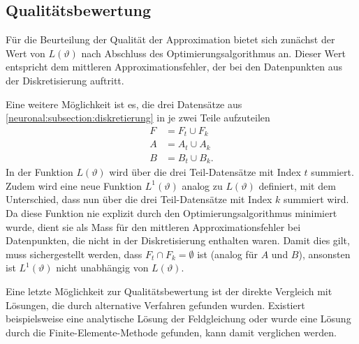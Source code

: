\subsection{Qualitätsbewertung}\label{neuronal:subsection:qualitätsbewertung}
%
Für die Beurteilung der Qualität der Approximation bietet sich zunächst der Wert von \( L(\vartheta) \) nach Abschluss des Optimierungsalgorithmus an.
Dieser Wert entspricht dem mittleren Approximationsfehler, der bei den Datenpunkten aus der Diskretisierung auftritt.

Eine weitere Möglichkeit ist es, die drei Datensätze aus \ref{neuronal:subsection:diskretierung} in je zwei Teile aufzuteilen
\begin{equation*}
    \begin{aligned}
        F &= F_t \cup F_k\\
        A &= A_t \cup A_k\\
        B &= B_t \cup B_k.
    \end{aligned}
\end{equation*}
In der Funktion $L(\vartheta)$ wird über die drei Teil-Datensätze mit Index $t$ summiert.
Zudem wird eine neue Funktion \( L^1(\vartheta) \) analog zu $L(\vartheta)$ definiert, mit dem Unterschied, dass nun über die drei Teil-Datensätze mit Index $k$ summiert wird.
Da diese Funktion nie explizit durch den Optimierungsalgorithmus minimiert wurde, dient sie als Mass für den mittleren Approximationsfehler bei Datenpunkten, die nicht in der Diskretisierung enthalten waren.
Damit dies gilt, muss sichergestellt werden, dass $F_t \cap F_k = \emptyset$ ist (analog für $A$ und $B$), ansonsten ist $L^1(\vartheta)$ nicht unabhängig von $L(\vartheta)$.

Eine letzte Möglichkeit zur Qualitätsbewertung ist der direkte Vergleich mit Lösungen, die durch alternative Verfahren gefunden wurden.
Existiert beispielsweise eine analytische Lösung der Feldgleichung oder wurde eine Lösung durch die Finite-Elemente-Methode gefunden, kann damit verglichen werden.
%
